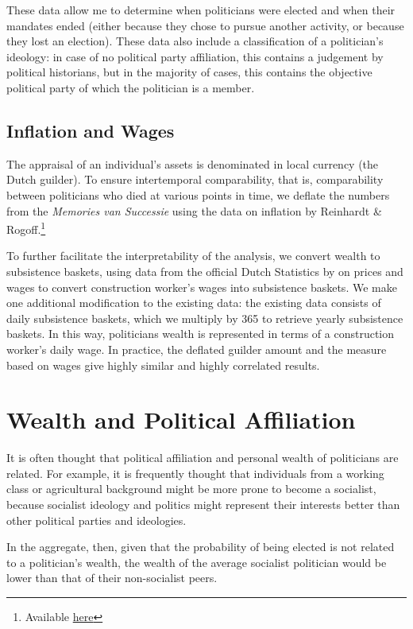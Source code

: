 These data allow me to determine when politicians were elected and when their mandates ended (either because they chose to pursue another activity, or because they lost an election). These data also include a classification of a politician's ideology: in case of no political party affiliation, this contains a judgement by political historians, but in the majority of cases, this contains the objective political party of which the politician is a member. 

\subsection{Inflation and Wages}
The appraisal of an individual's assets is denominated in local currency (the Dutch guilder). To ensure intertemporal comparability, that is, comparability between politicians who died at various points in time, we deflate the numbers from the \textit{Memories van Successie} using the data on inflation by Reinhardt \& Rogoff.\footnote{Available \href{https://carmenreinhart.com/2020/02/netherlands/}{here}}

To further facilitate the interpretability of the analysis, we convert wealth to subsistence baskets, using data from the official Dutch Statistics by \autocite{deZwart2015} on prices and wages to convert construction worker's wages into subsistence baskets. We make one additional modification to the existing data: the existing data consists of daily subsistence baskets, which we multiply by 365 to retrieve yearly subsistence baskets. In this way, politicians wealth is represented in terms of a construction worker's daily wage. In practice, the deflated guilder amount and the measure based on wages give highly similar and highly correlated results. 

\section{Wealth and Political Affiliation}
It is often thought that political affiliation and personal wealth of politicians are related. For example, it is frequently thought that individuals from a working class or agricultural background might be more prone to become a socialist, because socialist ideology and politics might represent their interests better than other political parties and ideologies. 

In the aggregate, then, given that the probability of being elected is not related to a politician's wealth, the wealth of the average socialist politician would be lower than that of their non-socialist peers. 

